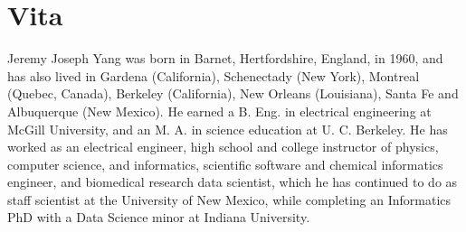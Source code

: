 \chapter*{Vita}

\doublespacing

Jeremy Joseph Yang was born in Barnet, Hertfordshire, England, in 1960, and has also lived in Gardena (California), Schenectady (New York), Montreal (Quebec, Canada), Berkeley (California), New Orleans (Louisiana), Santa Fe and Albuquerque (New Mexico). He earned a B. Eng. in electrical engineering at McGill University, and an M. A. in science education at U. C. Berkeley. He has worked as an electrical engineer, high school and college instructor of physics, computer science, and informatics, scientific software and chemical informatics engineer, and biomedical research data scientist, which he has continued to do as staff scientist at the University of New Mexico, while completing an Informatics PhD with a Data Science minor at Indiana University. 

